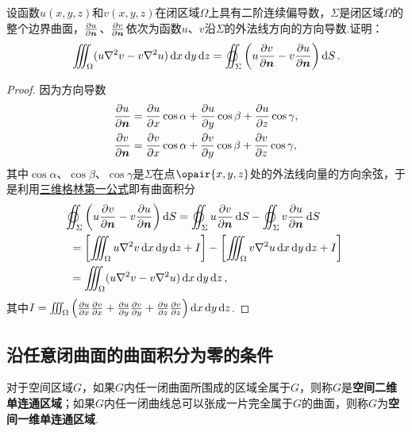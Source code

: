 \begin{example}[三维格林第二公式]
设函数\(u(x,y,z)\)和\(v(x,y,z)\)在闭区域\(\Omega\)上具有二阶连续偏导数，\(\Sigma\)是闭区域\(\Omega\)的整个边界曲面，\(\pdv{u}{\boldsymbol{n}}\)、\(\pdv{v}{\boldsymbol{n}}\)依次为函数\(u\)、\(v\)沿\(\Sigma\)的外法线方向的方向导数.证明：
\begin{equation}\label{equation:线积分与面积分.三维格林第二公式}
\iiint_{\Omega} (u \laplacian{v} - v \laplacian{u}) \dd{x}\dd{y}\dd{z}
=\varoiint_{\Sigma} \left( u \pdv{v}{\mat{n}} - v \pdv{u}{\mat{n}} \right) \dd{S}.
\end{equation}
\begin{proof}
\def\Io{\iiint_{\Omega} \left(%
\pdv{u}{x} \pdv{v}{x}%
+\pdv{u}{y} \pdv{v}{y}%
+\pdv{u}{z} \pdv{v}{z}%
\right) \dd{x}\dd{y}\dd{z}}%
因为方向导数\begin{align*}
\pdv{u}{\boldsymbol{n}}
&= \pdv{u}{x} \cos\alpha
+ \pdv{u}{y} \cos\beta
+ \pdv{u}{z} \cos\gamma, \\
\pdv{v}{\boldsymbol{n}}
&= \pdv{v}{x} \cos\alpha
+ \pdv{v}{y} \cos\beta
+ \pdv{v}{z} \cos\gamma,
\end{align*}其中\(\cos\alpha\)、\(\cos\beta\)、\(\cos\gamma\)是\(\Sigma\)在点\(\opair{x,y,z}\)处的外法线向量的方向余弦，于是利用\hyperref[equation:线积分与面积分.三维格林第一公式]{三维格林第一公式}即有曲面积分\begin{align*}
&\hspace{-5pt}\varoiint_{\Sigma} \left( u \pdv{v}{\mat{n}} - v \pdv{u}{\mat{n}} \right) \dd{S}
= \varoiint_{\Sigma} u \pdv{v}{\mat{n}} \dd{S}
- \varoiint_{\Sigma} v \pdv{u}{\mat{n}} \dd{S} \\
&= \left[ \iiint_{\Omega} u \laplacian{v} \dd{x}\dd{y}\dd{z} + I \right]
- \left[ \iiint_{\Omega} v \laplacian{u} \dd{x}\dd{y}\dd{z} + I \right] \\
&= \iiint_{\Omega} (u \laplacian{v} - v \laplacian{u}) \dd{x}\dd{y}\dd{z},
\end{align*}其中\(I = \Io\).
\end{proof}
\end{example}

\subsection{沿任意闭曲面的曲面积分为零的条件}
\begin{definition}
对于空间区域\(G\)，如果\(G\)内任一闭曲面所围成的区域全属于\(G\)，则称\(G\)是\textbf{空间二维单连通区域}；如果\(G\)内任一闭曲线总可以张成一片完全属于\(G\)的曲面，则称\(G\)为\textbf{空间一维单连通区域}.
\end{definition}

